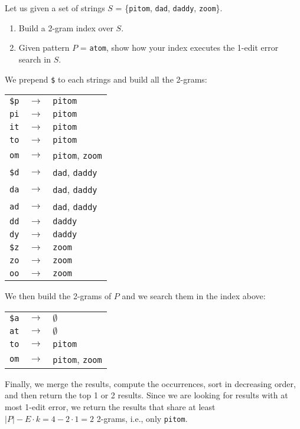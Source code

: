 \exercise

Let us given a set of strings $S$ = \{\texttt{pitom}, \texttt{dad},
\texttt{daddy}, \texttt{zoom}\}.

\begin{enumerate}

  \item Build a 2-gram index over $S$.

  \item Given pattern $P$ = \texttt{atom}, show how your index executes the
  1-edit error search in $S$.

\end{enumerate}

\solution

We prepend \texttt{\$} to each strings and build all the 2-grams:
%
\begin{longtable}{ccl}
  \texttt{\$p} & $\rightarrow$ & \texttt{pitom}\\
  \texttt{pi} & $\rightarrow$ & \texttt{pitom} \\
  \texttt{it} & $\rightarrow$ & \texttt{pitom} \\
  \texttt{to} & $\rightarrow$ & \texttt{pitom} \\
  \texttt{om} & $\rightarrow$ & \texttt{pitom}, \texttt{zoom} \\
  \texttt{\$d} & $\rightarrow$ & \texttt{dad}, \texttt{daddy} \\
  \texttt{da} & $\rightarrow$ & \texttt{dad}, \texttt{daddy} \\
  \texttt{ad} & $\rightarrow$ & \texttt{dad}, \texttt{daddy} \\
  \texttt{dd} & $\rightarrow$ & \texttt{daddy} \\
  \texttt{dy} & $\rightarrow$ & \texttt{daddy} \\
  \texttt{\$z} & $\rightarrow$ & \texttt{zoom} \\
  \texttt{zo} & $\rightarrow$ & \texttt{zoom} \\
  \texttt{oo} & $\rightarrow$ & \texttt{zoom} \\
\end{longtable}
%
We then build the 2-grams of $P$ and we search them in the index above:
%
\begin{longtable}{ccl}
  \texttt{\$a} & $\rightarrow$ & $\emptyset$\\
  \texttt{at} & $\rightarrow$ & $\emptyset$ \\
  \texttt{to} & $\rightarrow$ & \texttt{pitom} \\
  \texttt{om} & $\rightarrow$ & \texttt{pitom}, \texttt{zoom} \\
\end{longtable}
%
Finally, we merge the results, compute the occurrences, sort in decreasing
order, and then return the top 1 or 2 results. Since we are looking for results
with at most 1-edit error, we return the results that share at least
$|P| - E \cdot k = 4 - 2 \cdot 1 = 2$ 2-grams, i.e., only \texttt{pitom}.

